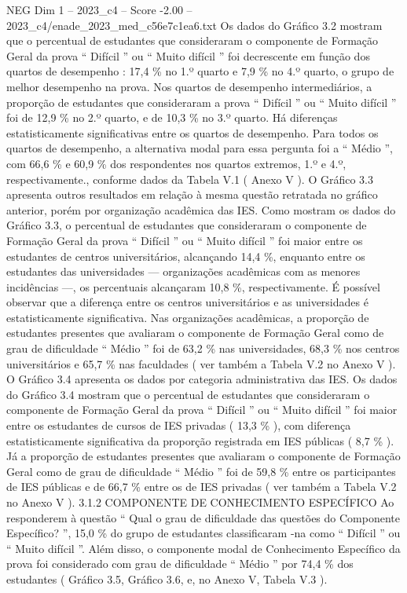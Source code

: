 \begin{textsample}{NEG Dim 1 – 2023\_c4 – Score -2.00 – 2023\_c4/enade\_2023\_med\_c56e7c1ea6.txt}
Os dados do Gráfico 3.2 mostram que o percentual de estudantes que consideraram o componente de Formação Geral da prova “ Difícil ” ou “ Muito difícil ” foi decrescente em função dos quartos de desempenho : 17,4 \% no 1.º quarto e 7,9 \% no 4.º quarto, o grupo de melhor desempenho na prova.
Nos quartos de desempenho intermediários, a proporção de estudantes que consideraram a prova “ Difícil ” ou “ Muito difícil ” foi de 12,9 \% no 2.º quarto, e de 10,3 \% no 3.º quarto.
Há diferenças estatisticamente significativas entre os quartos de desempenho.
Para todos os quartos de desempenho, a alternativa modal para essa pergunta foi a “ Médio ”, com 66,6 \% e 60,9 \% dos respondentes nos quartos extremos, 1.º e 4.º, respectivamente., conforme dados da Tabela V.1 ( Anexo V ).
O Gráfico 3.3 apresenta outros resultados em relação à mesma questão retratada no gráfico anterior, porém por organização acadêmica das IES.
Como mostram os dados do Gráfico 3.3, o percentual de estudantes que consideraram o componente de Formação Geral da prova “ Difícil ” ou “ Muito difícil ” foi maior entre os estudantes de centros universitários, alcançando 14,4 \%, enquanto entre os estudantes das universidades — organizações acadêmicas com as menores incidências —, os percentuais alcançaram 10,8 \%, respectivamente.
É possível observar que a diferença entre os centros universitários e as universidades é estatisticamente significativa.
Nas organizações acadêmicas, a proporção de estudantes presentes que avaliaram o componente de Formação Geral como de grau de dificuldade “ Médio ” foi de 63,2 \% nas universidades, 68,3 \% nos centros universitários e 65,7 \% nas faculdades ( ver também a Tabela V.2 no Anexo V ).
O Gráfico 3.4 apresenta os dados por categoria administrativa das IES.
Os dados do Gráfico 3.4 mostram que o percentual de estudantes que consideraram o componente de Formação Geral da prova “ Difícil ” ou “ Muito difícil ” foi maior entre os estudantes de cursos de IES privadas ( 13,3 \% ), com diferença estatisticamente significativa da proporção registrada em IES públicas ( 8,7 \% ).
Já a proporção de estudantes presentes que avaliaram o componente de Formação Geral como de grau de dificuldade “ Médio ” foi de 59,8 \% entre os participantes de IES públicas e de 66,7 \% entre os de IES privadas ( ver também a Tabela V.2 no Anexo V ). 3.1.2 COMPONENTE DE CONHECIMENTO ESPECÍFICO Ao responderem à questão “ Qual o grau de dificuldade das questões do Componente Específico? ”, 15,0 \% do grupo de estudantes classificaram -na como “ Difícil ” ou “ Muito difícil ”.
Além disso, o componente modal de Conhecimento Específico da prova foi considerado com grau de dificuldade “ Médio ” por 74,4 \% dos estudantes ( Gráfico 3.5, Gráfico 3.6, e, no Anexo V, Tabela V.3 ).

\end{textsample}
